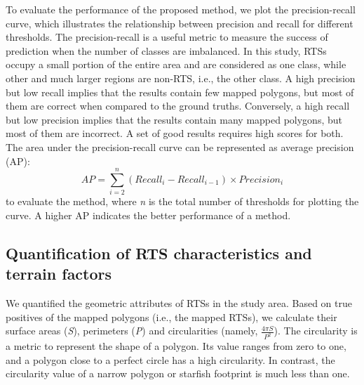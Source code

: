 \documentclass[preprint,12pt,authoryear]{elsarticle}
\begin{document}
To evaluate the performance of the proposed method, we plot the precision-recall curve, which illustrates the relationship between precision and recall for different thresholds. The precision-recall is a useful metric to measure the success of prediction when the number of classes are imbalanced. In this study, RTSs occupy a small portion of the entire area and are considered as one class, while other and much larger regions are non-RTS, i.e., the other class. A high precision but low recall implies that the results contain few mapped polygons, but most of them are correct when compared to the ground truths. Conversely, a high recall but low precision implies that the results contain many mapped polygons, but most of them are incorrect. A set of good results requires high scores for both. The area under the precision-recall curve can be represented as average precision (AP):
\begin{equation}
AP=\sum_{i=2}^{n} (Recall_i - Recall_{i-1})\times Precision_i 
\label{equ_ap}
\end{equation}
to evaluate the method, where \emph{n} is the total number of thresholds for plotting the curve. A higher AP indicates the better performance of a method.


\subsection{Quantification of RTS characteristics and terrain factors}
\label{subsec_quantify_rts}

We quantified the geometric attributes of RTSs in the study area. Based on true positives of the mapped polygons (i.e., the mapped RTSs), we calculate their surface areas (\emph{S}), perimeters (\emph{P}) and circularities (namely, $\frac{4 \pi S}{P^2} $). The circularity is a metric to represent the shape of a polygon. Its value ranges from zero to one, and a polygon close to a perfect circle has a high circularity. In contrast, the circularity value of a narrow polygon or starfish footprint is much less than one. 
\end{document}
